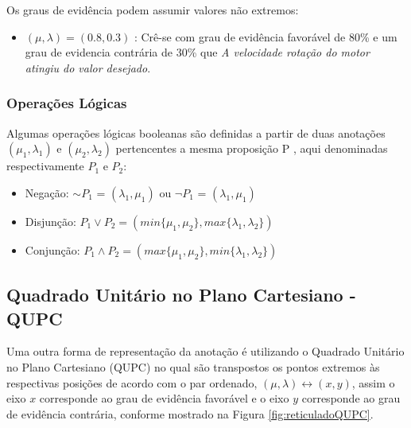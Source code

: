 Os graus de evidência podem assumir valores não extremos:

\begin{itemize}
\item 
$(\mu, \lambda ) = (0.8,0.3)$ : Crê-se com grau de evidência favorável de 80\% e um grau de evidencia contrária de 30\%  que \emph{A velocidade rotação do motor atingiu do valor desejado}.
\end{itemize}

\subsubsection{Operações Lógicas}

Algumas operações lógicas booleanas são definidas 
a partir de duas anotações 
$(\mu _1, \lambda _1)$ e $(\mu _2, \lambda _2)$ 
pertencentes a mesma proposição P 
\cite{JISFeAS} \cite{Abe2014},
aqui denominadas respectivamente $P_1$ e $P_2$:

\begin{itemize}

\item Negação: $\sim$$P _1$ = $(\lambda _1, \mu _1)$ ou 
$\neg$$P _1$ = $(\lambda _1, \mu _1)$

\item Disjunção: $P _1 \vee P _2 = 
(min\{\mu _1, \mu _2\},max\{\lambda _1, \lambda _2\})$ 

\item Conjunção: $P _1 \wedge P _2 = 
(max\{\mu _1, \mu _2\},min\{\lambda _1, \lambda _2\})$ 


\end{itemize}




\subsection{Quadrado Unitário no Plano Cartesiano - QUPC}

Uma outra forma de representação da anotação é utilizando o Quadrado Unitário no Plano Cartesiano (QUPC) no qual são transpostos os pontos extremos às respectivas posições de acordo com o par ordenado,  $(\mu, \lambda ) \leftrightarrow (x,y) $, assim o eixo $x$ corresponde ao grau de evidência favorável e o eixo $y$ corresponde ao grau de evidência contrária, conforme mostrado na Figura \ref{fig:reticuladoQUPC}.






